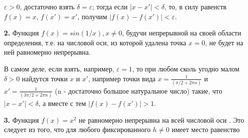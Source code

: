 \documentclass{book}
\begin{document}
\begin{math}\varepsilon > 0\end{math}, достаточно взять \begin{math}\delta = \varepsilon \end{math}; тогда если 
\begin{math}|x-x'| < \delta \end{math}, то, в силу равенств 
\begin{math} f(x) = x \end{math}, \begin{math} f(x') = x' \end{math}, получим
\begin{math} |f(x)-f(x')| < \varepsilon \end{math}.
\par \textsf{\textbf{\small{2.}}} Функция \begin{math}f(x) = sin(1/x), x \neq 0\end{math},
будучи непрерывной на своей области определения, т.е. на числовой оси, из которой удалена точка 
\begin{math}x = 0\end{math}, не будет на ней равномерно непрерывна.
\par В самом деле, если взять, например, \begin{math}\varepsilon = 1\end{math}, то при любом сколь угодно малом \begin{math}\delta > 0\end{math} найдутся точки $x$ и $x'$, например точки вида
\begin{math}x = \frac{1}{(\pi/2 + 2 \pi n)}\end{math} и \begin{math}x' = \frac{1}{(3\pi/2 + 2 \pi n)}\end{math}
(n - достаточно большое натуральное число) такие, что \begin{math}|x - x'| < \delta \end{math}, а вместе с тем
\begin{math}|f(x) - f(x')| > 1\end{math}.
\par \textsf{\textbf{\small{3.}}} Функция \begin{math}f(x) = x^2\end{math} не равномерно непрерывна на всей числовой оси \R. Это следует из того, что для любого фиксированного \begin{math}h \neq 0\end{math} имеет место равенство
\end{document}
